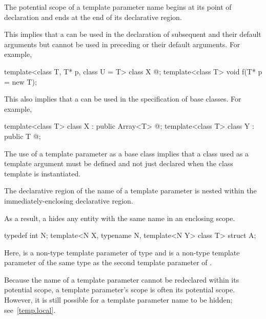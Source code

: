 \pnum
The potential scope of a template parameter name begins at its point of
declaration and ends at the end of its declarative region.
\begin{note} This implies that a  can be used in the
declaration of subsequent  and their default
arguments but cannot be used in preceding  or their
default arguments. For example,

\begin{codeblock}
template<class T, T* p, class U = T> class X { @\commentellip@ };
template<class T> void f(T* p = new T);
\end{codeblock}

This also implies that a  can be used in the
specification of base classes. For example,

\begin{codeblock}
template<class T> class X : public Array<T> { @\commentellip@ };
template<class T> class Y : public T { @\commentellip@ };
\end{codeblock}

The use of a template parameter as a base class implies that a class used as a template
argument must be defined and not just declared when the class template is instantiated.
\end{note}

\pnum
The declarative region of the name of a template parameter is nested within the
immediately-enclosing declarative region. \begin{note} As a result, a
 hides any entity with the same name in an enclosing
scope. \begin{example}

\begin{codeblock}
typedef int N;
template<N X, typename N, template<N Y> class T> struct A;
\end{codeblock}

Here,  is a non-type template parameter of type  and  is a
non-type template parameter of the same type as the second template parameter of
. \end{example}\end{note}

\pnum
\begin{note} Because the name of a template parameter cannot be redeclared within its
potential scope, a template parameter's scope is often its potential
scope. However, it is still possible for a template parameter name to be hidden;
see~\ref{temp.local}. \end{note}

